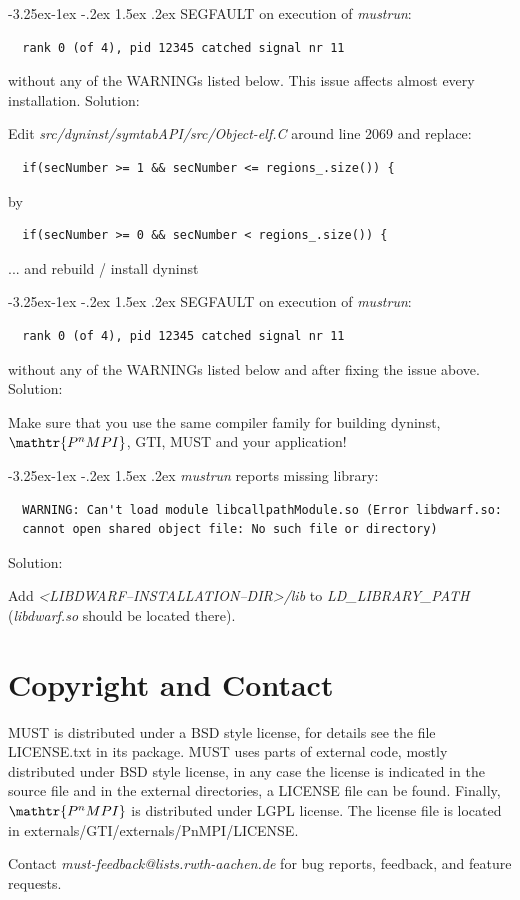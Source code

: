 \documentclass[english]{scrartcl}
\makeatletter
\newcommand{\pnmpi}{$\mathop{\mathtr{P^nMPI}}\nolimits$\xspace}
\renewcommand\paragraph{\@startsection{paragraph}{4}{\z@}%
  {-3.25ex\@plus -1ex \@minus -.2ex}%
  {1.5ex \@plus .2ex}%
  {\normalfont\normalsize\bfseries}}
\makeatother
\begin{document}
\paragraph{SEGFAULT on execution of \emph{mustrun}:}
\begin{verbatim}
  rank 0 (of 4), pid 12345 catched signal nr 11
\end{verbatim}
without any of the WARNINGs listed below. This issue affects almost every installation.\newline\newline
Solution:

Edit \emph{src/dyninst/symtabAPI/src/Object-elf.C} around line 2069 and replace:
\begin{verbatim}
  if(secNumber >= 1 && secNumber <= regions_.size()) {
\end{verbatim}
by
\begin{verbatim}
  if(secNumber >= 0 && secNumber < regions_.size()) {
\end{verbatim}
... and rebuild / install dyninst

\paragraph{SEGFAULT on execution of \emph{mustrun}:}
\begin{verbatim}
  rank 0 (of 4), pid 12345 catched signal nr 11
\end{verbatim}
without any of the WARNINGs listed below and after fixing the issue above.\newline\newline
Solution:

Make sure that you use the same compiler family for building dyninst, \pnmpi, 
GTI, MUST and your application!

\paragraph{\emph{mustrun} reports missing library:}

\begin{verbatim}
  WARNING: Can't load module libcallpathModule.so (Error libdwarf.so: 
  cannot open shared object file: No such file or directory)
\end{verbatim}
Solution:

Add \emph{\textless LIBDWARF\mbox{--}INSTALLATION\mbox{--}DIR\textgreater/lib} to 
\emph{LD\_LIBRARY\_PATH} (\emph{libdwarf.so} should be located there).


\section{Copyright and Contact}
MUST is distributed under a BSD style license, for details see the file
\mbox{LICENSE.txt} in its package. MUST uses parts of external code, mostly distributed 
under BSD style license, in any case the license is indicated in the source file and in 
the external directories, a LICENSE file can be found.
Finally, \pnmpi is distributed under LGPL license. The license file is located in 
\mbox{externals/GTI/externals/PnMPI/LICENSE}.


Contact \emph{must-feedback@lists.rwth-aachen.de} for bug reports, feedback, and
feature requests.
\end{document}
